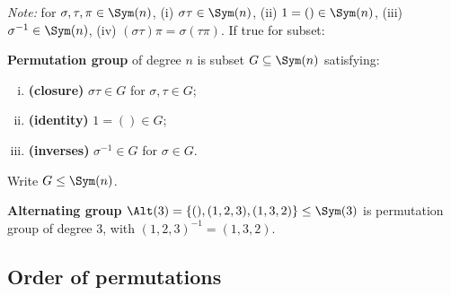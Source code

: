 \begin{slide}
    \textit{Note:} for $\sigma,\tau,\pi \in \Sym(n)$, (i) $\sigma\tau \in \Sym(n)$, (ii) $1 = () \in \Sym(n)$, (iii) $\sigma^{-1} \in \Sym(n)$, (iv) $(\sigma\tau)\pi = \sigma(\tau\pi)$. If true for subset:

    \begin{definition}
        \vspace{0pt}
        \textbf{Permutation group} of degree $n$ is subset $G \subseteq \Sym(n)$ satisfying:
        \begin{enumerate}[(i)]
            \item \textbf{(closure)} $\sigma\tau \in G$ for $\sigma,\tau \in G$; \pause
            \item \textbf{(identity)} $1 = () \in G$; \pause
            \item \textbf{(inverses)} $\sigma^{-1} \in G$ for $\sigma \in G$.
        \end{enumerate}
        Write $G \leq \Sym(n)$.
    \end{definition}

    \begin{example}
        \vspace{0pt}
        \textbf{Alternating group} $\Alt(3) = \{(),(1,2,3),(1,3,2)\} \leq \Sym(3)$ is permutation group of degree 3, with $(1,2,3)^{-1} = (1,3,2)$.
    \end{example}
\end{slide}

\subsection{Order of permutations}

